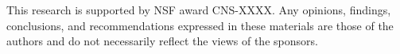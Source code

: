 This research is supported by NSF award CNS-XXXX. %
Any opinions, findings, conclusions, and recommendations expressed in these
materials are those of the authors and do not necessarily reflect the
views of the sponsors.